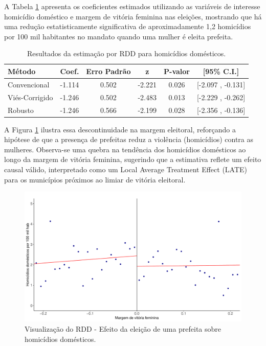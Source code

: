 A Tabela \ref{tab:resultados} apresenta os coeficientes estimados utilizando as variáveis de interesse homicídio doméstico e margem de vitória feminina nas eleições, mostrando que há uma redução estatisticamente significativa de aproximadamente 1,2 homicídios por 100 mil habitantes no mandato quando uma mulher é eleita prefeita.

\begin{table}[h]
    \centering
    \begin{tabular}{lccccc}
        \toprule
        \textbf{Método} & \textbf{Coef.} & \textbf{Erro Padrão} & \textbf{z} & \textbf{P-valor} & \textbf{[95\% C.I.]} \\
        \midrule
        Convencional    & -1.114 & 0.502 & -2.221 & 0.026 & [-2.097 , -0.131] \\
        Viés-Corrigido  & -1.246 & 0.502 & -2.483 & 0.013 & [-2.229 , -0.262] \\
        Robusto         & -1.246 & 0.566 & -2.199 & 0.028 & [-2.356 , -0.136] \\
        \bottomrule
    \end{tabular}
    \caption{Resultados da estimação por RDD para homicídios domésticos.}
    \label{tab:resultados}
\end{table}

A Figura \ref{fig:rdd_plot} ilustra essa descontinuidade na margem eleitoral, reforçando a hipótese de que a presença de prefeitas reduz a violência (homicídios) contra as mulheres. Observa-se uma quebra na tendência dos homicídios domésticos ao longo da margem de vitória feminina, sugerindo que a estimativa reflete um efeito causal válido, interpretado como um Local Average Treatment Effect (LATE) para os municípios próximos ao limiar de vitória eleitoral.


\begin{figure}
    \centering
    \includegraphics[width=0.8\linewidth]{relatorios/close_elections/graficos/rdd_plot.pdf}
    \caption{Visualização do RDD - Efeito da eleição de uma prefeita sobre homicídios domésticos.}
    \label{fig:rdd_plot}
\end{figure}

